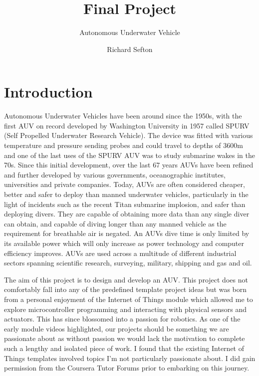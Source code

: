 \documentclass[11pt,a4paper,titlepage]{report}
\title{Final Project}
\subtitle{Autonomous Underwater Vehicle}
\author{Richard Sefton}
\begin{document}
	\maketitle
	\tableofcontents

	\chapter*{Introduction}
	Autonomous Underwater Vehicles have been around since the 1950s, with the first AUV on record developed by Washington University in 1957 called SPURV\cite{SPURV} (Self Propelled Underwater Research Vehicle). The device was fitted with various temperature and pressure sending probes and could travel to depths of 3600\unit{\meter} and one of the last uses of the SPURV AUV was to study submarine wakes in the 70s. Since this initial development, over the last 67 years AUVs have been refined and further developed by various governments, oceanographic institutes, universities and private companies. Today, AUVs are often considered cheaper, better and safer to deploy than manned underwater vehicles, particularly in the light of incidents such as the recent Titan submarine implosion\cite{TITAN_IMPLOSION}, and safer than deploying divers. They are capable of obtaining more data than any single diver can obtain, and capable of diving longer than any manned vehicle as the requirement for breathable air is negated. An AUVs dive time is only limited by its available power which will only increase as power technology and computer efficiency improves. AUVs are used across a multitude of different industrial sectors spanning scientific research, surveying, military, shipping and gas and oil\cite{AUV_MARKETSHARE}. 
	
	The aim of this project is to design and develop an AUV. This project does not comfortably fall into any of the predefined template project ideas but was born from a personal enjoyment of the Internet of Things module which allowed me to explore microcontroller programming and interacting with physical sensors and actuators. This has since blossomed into a passion for robotics. As one of the early module videos highlighted, our projects should be something we are passionate about as without passion we would lack the motivation to complete such a lengthy and isolated piece of work\cite{COURSERA_PROJECT_VIDEO}. I found that the existing Internet of Things templates involved topics I'm not particularly passionate about. I did gain permission from the Coursera Tutor Forums prior to embarking on this journey\cite{COURSERA_PROJECT_PERMISSION}.
	
\end{document}
